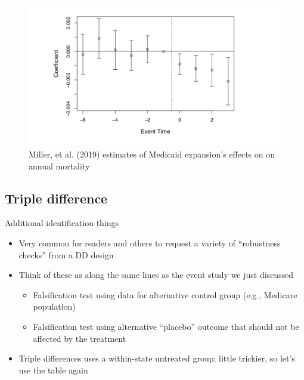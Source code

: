 \documentclass{beamer}
\begin{document}

\begin{frame}[plain]

	\begin{figure}
	\includegraphics[scale=0.3]{./lecture_includes/Miller_Medicaid4.png}
	\caption{Miller, et al. (2019) estimates of Medicaid expansion's effects on on annual mortality}
	\end{figure}

\end{frame}

\subsection{Triple difference}

\begin{frame}{Additional identification things}
	
	\begin{itemize}
	\item Very common for readers and others to request a variety of ``robustness checks'' from a DD design
	\item Think of these as along the same lines as the event study we just discussed
		\begin{itemize}
		\item Falsification test using data for alternative control group (e.g., Medicare population)
		\item Falsification test using alternative ``placebo'' outcome that should not be affected by the treatment
		\end{itemize}
	\item Triple differences uses a within-state untreated group; little trickier, so let's use the table again
	\end{itemize}
\end{frame}
\end{document}
